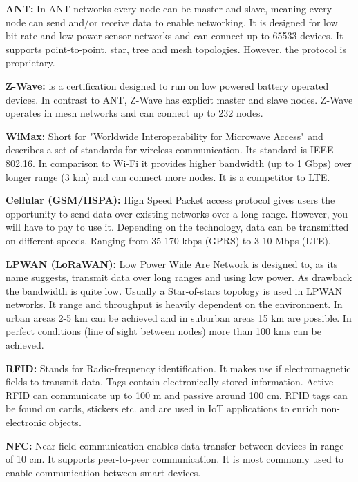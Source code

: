 \textbf{ANT:} In ANT networks every node can be master and slave, meaning every node can send and/or receive data to enable networking. It is designed for low bit-rate and low power sensor networks and can connect up to 65533 devices. It supports point-to-point, star, tree and mesh topologies. However, the protocol is proprietary.\cite{Perera:2017:FCS:3101309.3057266}

\textbf{Z-Wave:} is a certification designed to run on low powered battery operated devices. In contrast to ANT, Z-Wave has explicit master and slave nodes. Z-Wave operates in mesh networks and can connect up to 232 nodes.\cite{Perera:2017:FCS:3101309.3057266}

\textbf{WiMax:} Short for "Worldwide Interoperability for Microwave Access" and describes a set of standards for wireless communication. Its standard is IEEE 802.16. In comparison to Wi-Fi it provides higher bandwidth (up to 1 Gbps) over longer range (3 km) and can connect more nodes. It is a competitor to LTE.\cite{Perera:2017:FCS:3101309.3057266}

\textbf{Cellular (GSM/HSPA):} High Speed Packet access protocol gives users the opportunity to send data over existing networks over a long range. However, you will have to pay to use it. Depending on the technology, data can be transmitted on different speeds. Ranging from 35-170 kbps (GPRS) to 3-10 Mbps (LTE).\cite{Perera:2017:FCS:3101309.3057266}

\textbf{LPWAN (LoRaWAN):} Low Power Wide Are Network is designed to, as its name suggests, transmit data over long ranges and using low power. As drawback the bandwidth is quite low. Usually a Star-of-stars topology is used in LPWAN networks. It range and throughput is heavily dependent on the environment. In urban areas 2-5 km can be achieved and in suburban areas 15 km are possible. In perfect conditions (line of sight between nodes) more than 100 kms can be achieved.\cite{Perera:2017:FCS:3101309.3057266}


\textbf{RFID:} Stands for Radio-frequency identification. It makes use if electromagnetic fields to transmit data. Tags contain electronically stored information. Active RFID can communicate up to 100 m and passive around 100 cm. RFID tags can be found on cards, stickers etc. and are used  in IoT applications to enrich non-electronic objects.\cite{Perera:2017:FCS:3101309.3057266}

\textbf{NFC:} Near field communication enables data transfer between devices in range of 10 cm. It supports peer-to-peer communication. It is most commonly used to enable communication between smart devices.\cite{Perera:2017:FCS:3101309.3057266}